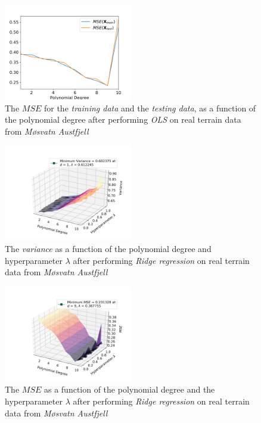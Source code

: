 \documentclass[a4paper,10pt,english]{article}
\begin{document}
\begin{multicols*}{2}
\begin{figure}[H]
	\centering 
	\includegraphics[width = 0.5\textwidth, center]{../real_output/part_C_2.png}
	\caption{The $MSE$ for the \textit{training data} and the \textit{testing data}, as a function of the polynomial degree after performing \textit{OLS} on real terrain data from \textit{Møsvatn Austfjell}}
	\label{fig_18}
\end{figure}

\begin{figure}[H]
	\centering 
	\includegraphics[width = 0.5\textwidth, center]{../real_output/part_D_1.png}
	\caption{The \textit{variance} as a function of the polynomial degree and hyperparameter $\lambda$ after performing \textit{Ridge regression} on real terrain data from \textit{Møsvatn Austfjell}}
	\label{fig_19}
\end{figure}

\begin{figure}[H]
	\centering 
	\includegraphics[width = 0.5\textwidth, center]{../real_output/part_D_2.png}
	\caption{The $MSE$ as a function of the polynomial degree and the hyperparameter $\lambda$ after performing \textit{Ridge regression} on real terrain data from \textit{Møsvatn Austfjell}}
	\label{fig_20}
\end{figure}


\end{multicols*}
\end{document}
